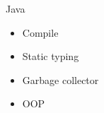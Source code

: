 \begin{frame}{Java}
  \begin{center}
    \begin{itemize}
      \item Compile
      \item Static typing
      \item Garbage collector
      \item OOP
    \end{itemize}
  \end{center}
\end{frame}